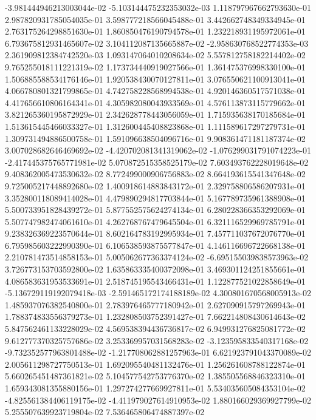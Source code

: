 -3.981444946213003044e-02
-5.103144475232353032e-03
1.118797967662793630e-01
2.987820931785054035e-01
3.598777218566045488e-01
3.442662748349334945e-01
2.763175264298851630e-01
1.860850476190794578e-01
1.232218931195972061e-01
6.793675812931465607e-02
3.104112087135665887e-02
-2.958630768522774353e-03
2.361909812384742520e-03
1.093147064010208634e-02
5.557812758182214402e-02
9.765255018111221319e-02
1.173734440919027566e-01
1.361475376998330100e-01
1.506885588534176146e-01
1.920538430070127811e-01
3.076550621100913041e-01
4.066780801321799865e-01
4.742758228568994538e-01
4.920146360517571038e-01
4.417656610806164341e-01
4.305982080043933569e-01
4.576113873115779662e-01
3.821265360195872929e-01
2.342628778443056059e-01
1.715935638170185684e-01
1.513615445466033327e-01
1.312600445408823868e-01
1.111589617297279731e-01
1.309731494886500758e-01
1.591096638504096716e-01
9.908361471181187374e-02
3.007028682646469692e-02
-4.420702081341319062e-02
-1.076299031791074223e-01
-2.417445375765771981e-02
5.070872515358525179e-02
7.603493762228019648e-02
9.408362005473530632e-02
8.772499000906756883e-02
8.664193615541347648e-02
9.725005217448892680e-02
1.400918614883843172e-01
2.329758806586207931e-01
3.352800118089414028e-01
4.479890294817703844e-01
5.167789735961388908e-01
5.500733951828439272e-01
5.877552575624274134e-01
6.280228366353292069e-01
5.507747982474061610e-01
4.262768767479645504e-01
6.321116529969785791e-01
9.238326369223570644e-01
8.602164783192995934e-01
7.457711037672076770e-01
6.795985603222990390e-01
6.106538593875577847e-01
4.146116696722668138e-01
2.210781473514858153e-01
5.005062677363374124e-02
-6.695155039838573963e-02
3.726773153703592800e-02
1.635863335400372098e-01
3.469301124251855661e-01
4.086583631953533691e-01
2.518745195543466431e-01
1.122877521022858649e-01
-5.136729119192079418e-03
-2.591465172174188189e-02
4.300801670568005913e-02
1.485937076382540800e-01
2.783976465777180942e-01
2.627090915797269943e-01
1.788374833556379273e-01
1.232808503752391427e-01
7.662214808430614643e-02
5.847562461133228029e-02
4.569538394436736817e-02
6.949931276825081772e-02
9.612777370325757686e-02
3.253369957031568283e-02
-3.123595833540317168e-02
-9.732352577963801488e-02
-1.217708062881257963e-01
6.621923791043370089e-02
2.005611298727750513e-01
1.692095540481132476e-01
1.256261608788122874e-01
5.660265451487361821e-02
5.104577542753776370e-02
1.385505568846323310e-01
1.659343081355880156e-01
1.297274277669927811e-01
5.534035605084353104e-02
-4.825561384406119175e-02
-4.411979027614910953e-02
1.880166029369927799e-02
5.255507639923719804e-02
7.536465806474887397e-02
